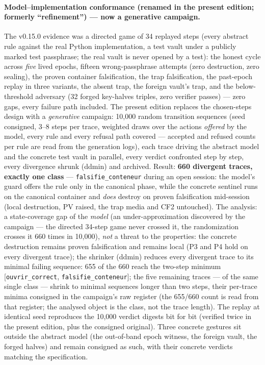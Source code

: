 \documentclass[11pt,a4paper]{article}
\newcommand{\code}[1]{\texttt{\small #1}}
\begin{document}
\paragraph{Model--implementation conformance (renamed in the present
edition; formerly ``refinement'') --- now a generative campaign.} The
v0.15.0 evidence was a directed game of 34 replayed steps (every
abstract rule against the real Python implementation, a test vault
under a publicly marked test passphrase; the real vault is never opened
by a test): the honest cycle across \emph{five} lived epochs, fifteen
wrong-passphrase attempts (zero destruction, zero sealing), the proven
container falsification, the trap falsification, the past-epoch replay
in three variants, the absent trap, the foreign vault's trap, and the
below-threshold adversary (32 forged key-halves triples, zero verifier
passes) --- zero gaps, every failure path included. The present edition
replaces the chosen-steps design with a \emph{generative} campaign:
10{,}000 random transition sequences (seed consigned, 3--8 steps per
trace, weighted draws over the actions \emph{offered} by the model,
every rule and every refusal path covered --- accepted and refused
counts per rule are read from the generation logs), each trace driving
the abstract model and the concrete test vault in parallel, every
verdict confronted step by step, every divergence shrunk (ddmin) and
archived. Result: \textbf{660 divergent traces, exactly one class} ---
\code{falsifie\_conteneur} during an open session: the model's guard
offers the rule only in the canonical phase, while the concrete
sentinel runs on the canonical container and \emph{does} destroy on
proven falsification mid-session (local destruction, PV raised, the
trap media and CF2 untouched). The analysis: a state-coverage gap of
the \emph{model} (an under-approximation discovered by the campaign
--- the directed 34-step game never crossed it, the randomization
crosses it 660 times in 10{,}000), \emph{not} a threat to the
properties: the concrete destruction remains proven falsification and
remains local (P3 and P4 hold on every divergent trace); the shrinker
(ddmin) reduces every divergent trace to its minimal failing sequence:
655 of the 660 reach the two-step minimum [\code{ouvrir\_correct},
\code{falsifie\_conteneur}]; the five remaining traces --- of the same
single class --- shrink to minimal sequences longer than two steps,
their per-trace minima consigned in the campaign's raw register (the
655/660 count is read from that register; the analysed object is the
class, not the trace length). The replay at
identical seed reproduces the 10{,}000 verdict digests bit for
bit (verified twice in the present edition, plus the consigned
original). Three concrete gestures sit outside the abstract model
(the out-of-band epoch witness, the foreign vault, the forged halves)
and remain consigned as such, with their concrete verdicts matching
the specification.
\end{document}
